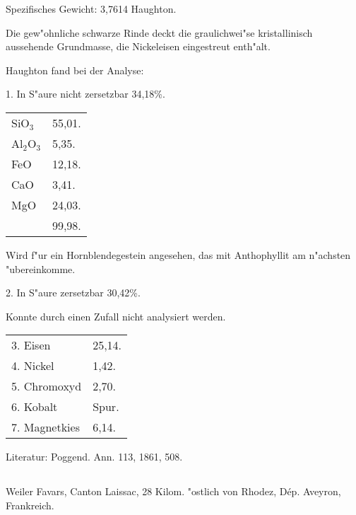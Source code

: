 \documentclass[a4paper, 11pt, oneside]{article}
\begin{document}
Spezifisches Gewicht: 3,7614 Haughton.

Die gew"ohnliche schwarze Rinde deckt die graulichwei"se kristallinisch aussehende Grundmasse, die Nickeleisen eingestreut enth"alt.

Haughton fand bei der Analyse:
\begin{center}
1. In S"aure nicht zersetzbar 34,18\%.
\end{center}

\begin{table}[H]
    \centering\swabfamily\Large
    \begin{tabular}{l l}
        SiO$_{3}$ & 55,01. \\
        Al$_{2}$O$_{3}$ & 5,35. \\
        FeO & 12,18. \\
        CaO & 3,41. \\
        MgO & 24,03. \\
         & 99,98. \\
    \end{tabular}
\end{table}

Wird f"ur ein Hornblendegestein angesehen, das mit Anthophyllit am n"achsten "ubereinkomme.

\begin{center}
2. In S"aure zersetzbar 30,42\%.
\end{center}

Konnte durch einen Zufall nicht analysiert werden.

\begin{table}[H]
    \centering\swabfamily\Large
    \begin{tabular}{l l}
        3. Eisen & 25,14. \\
        4. Nickel & 1,42. \\
        5. Chromoxyd & 2,70. \\
        6. Kobalt & Spur. \\
        7. Magnetkies & 6,14. \\
    \end{tabular}
\end{table}

\normalsize
Literatur: Poggend. Ann. 113, 1861, 508.

\subsection{}
\LARGE
\paragraph{}
Weiler Favars, Canton Laissac, 28 Kilom. "ostlich von Rhodez, Dép. Aveyron, Frankreich.
\end{document}
